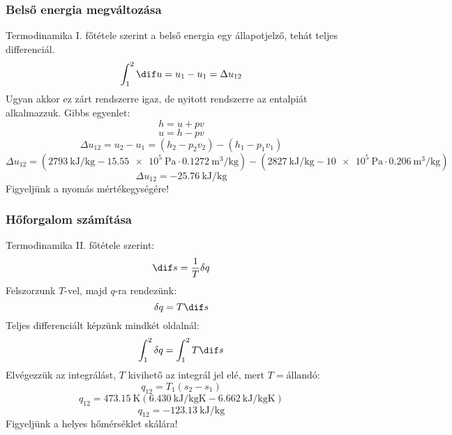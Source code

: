 		\subsubsection{Belső energia megváltozása}
			Termodinamika I. főtétele szerint a belső energia egy állapotjelző, tehát teljes differenciál.
			\[ \int_{1}^{2} \dif u = u_1 - u_1 = \Delta u_{12}
			\]  
			Ugyan akkor ez zárt rendszerre igaz, de nyitott rendszerre az entalpiát alkalmazzuk. Gibbs egyenlet:
			\[ h=u+pv\]  
			\[u=h-pv\] 
			\begin{equation*}
				\Delta u_{12} = u_2 - u_1 = \left(h_2 -p_2  v_2\right) - \left(h_1 -p_1  v_1\right) 				 
			\end{equation*}
			\begin{equation}
				\Delta u_{12} = \left( \SI{2793}{\kilo\joule\per\kilogram} - \SI{15,55e5}{\pascal} \cdot \SI{0,1272}{\meter\cubed\per\kilogram} \right) - \left( \SI{2827}{\kilo\joule\per\kilogram} - \SI{10e5}{\pascal} \cdot \SI{0,206}{\meter\cubed\per\kilogram} \right) 
			\end{equation}
			\begin{equation}
				\Delta u_{12} = \SI{-25,76}{\kilo\joule\per\kilogram} 
			\end{equation}
                                Figyeljünk a nyomás mértékegységére!
		\subsubsection{Hőforgalom számítása}
			Termodinamika II. főtétele szerint:
			\[ \dif s=\dfrac {1}{T} \delta q\] 
			Felszorzunk $T$-vel, majd $q$-ra rendezünk:
			\[ \delta q=T\dif s \]
			Teljes differenciált képzünk mindkét oldalnál:
			\[\int_{1}^{2} \delta q = \int_{1}^{2} T\dif s \]
                                Elvégezzük az integrálást, $T$ kivihető az integrál jel elé, mert $T=\text{állandó}$:
			\begin{equation*}
				q_{12} = T_1\left( s_2 - s_1\right) 
			\end{equation*}   
			\begin{equation}
				q_{12} = \SI{473,15}{\kelvin} \left( \SI{6,430}{\kilo\joule\per\kilogram\kelvin} -\SI{6,662}{\kilo\joule\per\kilogram\kelvin}   \right) 
			\end{equation}
			\begin{equation}
				q_{12} = \SI{-123,13}{\kilo\joule\per\kilogram}
			\end{equation}	
                                 Figyeljünk a helyes hőmérséklet skálára!
